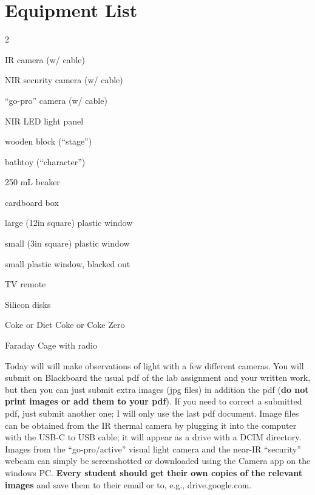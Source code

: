 
\section*{Equipment List}

\begin{multicols}{2}   %
\begin{equipment}
  \item IR camera (w/ cable)
  \item NIR security camera (w/ cable)
  \item ``go-pro'' camera (w/ cable)
 \item NIR LED light panel
 \item wooden block (``stage'')
 \item bathtoy (``character'')
 \item 250 mL beaker
  \item cardboard box
  \item large (12in square) plastic window
  \item small (3in square) plastic window
  \item small plastic window, blacked out
  \item TV remote
  \item Silicon disks
  \item Coke or Diet Coke or Coke Zero
  \item Faraday Cage with radio
\end{equipment}
\end{multicols}

 Today will will make observations of light with a few different cameras.  You will submit on Blackboard the usual pdf of the lab assignment and your written work, but then you can just submit extra images (jpg files) in addition the pdf ({\bf do not print images or add them to your pdf}). If you need to correct a submitted pdf, just submit another one; I will only use the last pdf document.  Image files can be obtained from the IR thermal camera by plugging it into the computer with the USB-C to USB cable; it will appear as a drive with a DCIM directory.  Images from the ``go-pro/active'' visual light camera and the near-IR ``security'' webcam can simply be screenshotted or downloaded using the Camera app on the windows PC.  {\bf Every student should get their own copies of the relevant images} and save them to their email or to, e.g., drive.google.com.  

